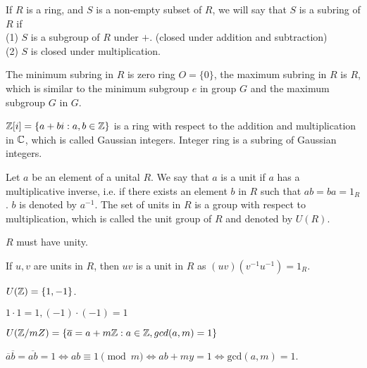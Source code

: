 \begin{definition}{}{}
    If $R$ is a ring, and $S$ is a non-empty subset of $R$, we will say that $S$ is a subring of $R$ if \\
    (1) $S$ is a subgroup of $R$ under $+$. (closed under addition and subtraction)\\
    (2) $S$ is closed under multiplication. 
\end{definition}

\begin{remark}
    The minimum subring in $R$ is zero ring $O=\{0\}$, the maximum subring in $R$ is $R$, 
    which is similar to the minimum subgroup ${e}$ in group $G$ and the maximum subgroup $G$ in $G$. 
\end{remark}

\begin{example}{}{}
    $\mathbb{Z}[i]=\{a+bi:a,b\in\mathbb{Z}\}$ is a ring with respect to the addition and multiplication in $\mathbb{C}$, which is called Gaussian integers.
    Integer ring is a subring of Gaussian integers.  
\end{example}

\begin{definition}{}{}
    Let $a$ be an element of a unital $R$. We say that $a$ is a unit if $a$ has a multiplicative inverse, i.e. 
    if there exists an element $b$ in $R$ such that $ab=ba=1_R$. $b$ is denoted by $a^{-1}$.
    The set of units in $R$ is a group with respect to multiplication, which is called the unit group of $R$ and denoted by $U(R)$.
\end{definition}
\begin{remark}
    $R$ must have unity.
\end{remark}
\begin{remark}
    If $u,v$ are units in $R$, then $uv$ is a unit in $R$ as $(uv)(v^{-1}u^{-1})=1_R$.
\end{remark}

\begin{example}{}{}
    $U(\mathbb{Z})=\{1,-1\}$.
\end{example}

$1\cdot 1=1,(-1)\cdot (-1)=1$


\begin{example}{}{}
    $U(\mathbb{Z}/mZ) = \{\overline{a}=a+m\mathbb{Z}: a\in\mathbb{Z}, gcd(a,m)=1\}$
\end{example}

$\overline{a}\overline{b}=\overline{ab}=1\Leftrightarrow ab\equiv 1\pmod m\Leftrightarrow ab+my=1\Leftrightarrow \text{gcd}(a,m)=1$.

